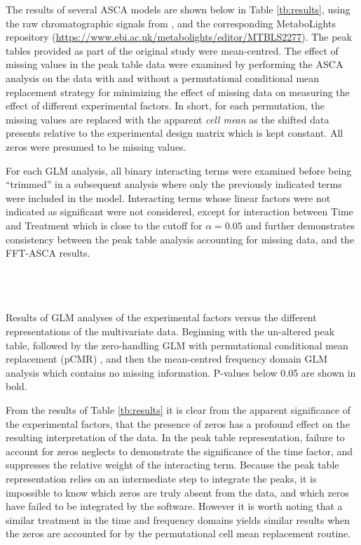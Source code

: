 \documentclass[preprint,12pt]{elsarticle}
\begin{document}
The results of several ASCA models are shown below in Table \ref{tb:results}, using the raw chromatographic signals from \cite{lo2023immune}, and the corresponding MetaboLights repository (\url{https://www.ebi.ac.uk/metabolights/editor/MTBLS2277}). The peak tables provided as part of the original study were mean-centred. The effect of missing values in the peak table data were examined by performing the ASCA analysis on the data with and without a permutational conditional mean replacement strategy for minimizing the effect of missing data on measuring the effect of different experimental factors. In short, for each permutation, the missing values are replaced with the apparent \textit{cell mean} as the shifted data presents relative to the experimental design matrix which is kept constant. All zeros were presumed to be missing values.

For each GLM analysis, all binary interacting terms were examined before being ``trimmed'' in a subsequent analysis where only the previously indicated terms were included in the model. Interacting terms whose linear factors were not indicated as significant were not considered, except for interaction between Time and Treatment which is close to the cutoff for $\alpha = 0.05$ and further demonstrates consistency between the peak table analysis accounting for missing data, and the FFT-ASCA results.

\begin{table} %
 \\
 \\ 
 \\

\caption{Results of GLM analyses of the experimental factors versus the different representations of the multivariate data. Beginning with the un-altered peak table, followed by the zero-handling GLM with permutational conditional mean replacement (pCMR) \cite{pCMR}, and then the mean-centred frequency domain GLM analysis which contains no missing information. P-values below 0.05 are shown in bold.}
\label{tb:results}

\end{table}

From the results of Table \ref{tb:results} it is clear from the apparent significance of the experimental factors, that the presence of zeros has a profound effect on the resulting interpretation of the data. In the peak table representation, failure to account for zeros neglects to demonstrate the significance of the time factor, and suppresses the relative weight of the interacting term. Because the peak table representation relies on an intermediate step to integrate the peaks, it is impossible to know which zeros are truly absent from the data, and which zeros have failed to be integrated by the software. However it is worth noting that a similar treatment in the time and frequency domains yields similar results when the zeros are accounted for by the permutational cell mean replacement routine. 
\end{document}

